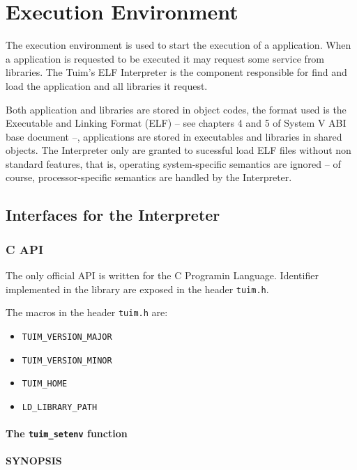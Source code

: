 \chapter{Execution Environment}

The execution environment is used to start the execution of a application.
When a application is requested to be executed it
may request some service from libraries.
The Tuim's ELF Interpreter is the component responsible for
find and load the application and all libraries it request.

Both application and libraries are stored in object codes,
the format used is the Executable and Linking Format (ELF)
-- see chapters 4 and 5 of System V ABI\cite{sysv} base document --,
applications are stored in executables and libraries in shared objects.
The Interpreter only are granted to sucessful load
ELF files without non standard features, that is,
operating system-specific semantics are ignored
-- of course, processor-specific semantics are handled by the Interpreter.

\section{Interfaces for the Interpreter}

\subsection{C API}

The only official API is written for the C Programin Language\cite{ISO9899}.
Identifier implemented in the library are exposed in the
header \texttt{tuim.h}.

The macros in the header \texttt{tuim.h} are:

\begin{itemize}
   \item \texttt{TUIM\_VERSION\_MAJOR}
   \item \texttt{TUIM\_VERSION\_MINOR}
   \item \texttt{TUIM\_HOME}
   \item \texttt{LD\_LIBRARY\_PATH}
\end{itemize}

\subsubsection{The \texttt{tuim\_setenv} function}

\subsubsection*{SYNOPSIS}

